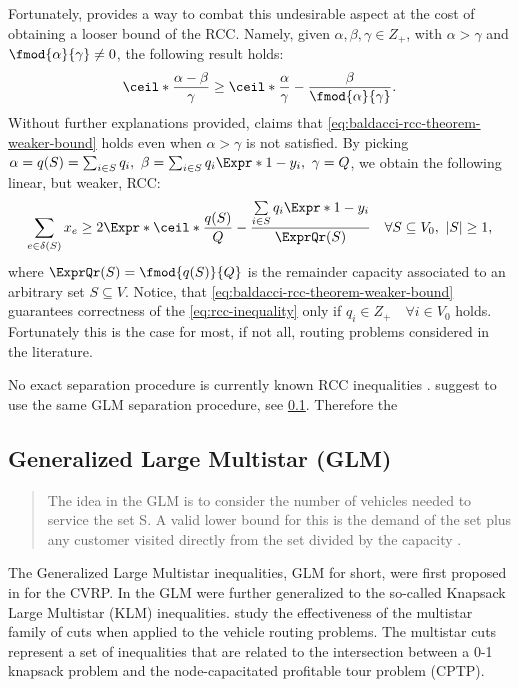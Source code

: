 Fortunately, \textcite{baldacci2007capacitated} provides a way to
combat this undesirable aspect at the cost of obtaining a looser bound of the RCC.
Namely, given $\alpha, \beta, \gamma \in Z_+$, with $\alpha > \gamma$ and
$\fmod{\alpha}{\gamma} \ne 0$, the following result holds:
\begin{equation}
	\label{eq:baldacci-rcc-theorem-weaker-bound}
	\ceil*{\frac{\alpha - \beta}{\gamma}} \ge \ceil*{\frac{\alpha}{\gamma}} - \frac{\beta}{\fmod{\alpha}{\gamma}}.
\end{equation}
Without further explanations provided,
\textcite{jepsen2014} claims that \cref{eq:baldacci-rcc-theorem-weaker-bound}
holds even when $\alpha > \gamma$ is not satisfied.
By picking $\alpha = q(S) = \sum_{i \in S} q_i,\ \beta = \sum_{i \in S} q_i\Expr*{1 - y_i},\ \gamma = Q$,
we obtain the following linear, but weaker, RCC:
\begin{equation}
	\label{eq:rcc-inequality}
	\sum\limits_{e \in \delta(S)} x_e \ge 2 \Expr*{\ceil*{\frac{q(S)}{Q}} - \frac{\sum\limits_{i \in S} q_i \Expr*{1 - y_i}}{\ExprQr(S)}} \quad \forall S \subseteq V_0,\ |S| \ge 1,
\end{equation}
where $\ExprQr(S) = \fmod{q(S)}{Q}$ is the remainder capacity associated
to an arbitrary set $S \subseteq V$.
Notice, that \cref{eq:baldacci-rcc-theorem-weaker-bound} guarantees correctness
of the \cref{eq:rcc-inequality} only if $q_i \in Z_+ \quad \forall i \in V_0$ holds.
Fortunately this is the case for most, if not all, routing problems considered in the literature.

No exact separation procedure is currently known RCC inequalities \parencite{jepsen2014}.
\textcite{jepsen2014} suggest to use the same GLM separation procedure, see \cref{sec:cptp-glm}.
Therefore the

\subsection{Generalized Large Multistar (GLM)}
\label{sec:cptp-glm}

\begin{quote}
	The idea in the GLM is to consider the number of vehicles needed to service
	the set S. A valid lower bound for this is the demand of the set plus any
	customer visited directly from the set divided by the capacity \cite{jepsen2011}.
\end{quote}

The Generalized Large Multistar inequalities,
GLM for short,
were first proposed in \textcite{gouveia1995} for the CVRP.
In \textcite{letchford2002}
the GLM were further generalized to the so-called Knapsack Large Multistar (KLM) inequalities.
\textcite{letchford2006} study the effectiveness of the multistar family of cuts
when applied to the vehicle routing problems.
The multistar cuts represent a set of inequalities that are related to
the intersection between a 0-1 knapsack problem and the node-capacitated profitable tour problem (CPTP).

